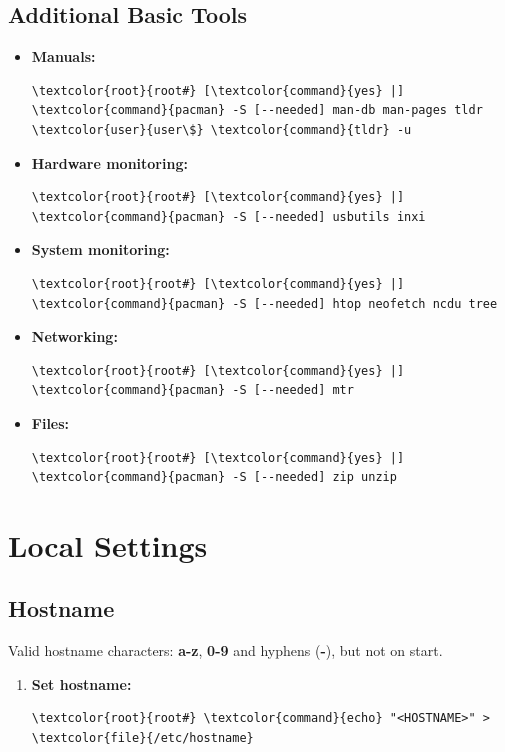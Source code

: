\documentclass[10pt, a4paper, onecolumn, oneside, titlepage, openany]{book}
\begin{document}
\section{Additional Basic Tools}
\begin{itemize}
    \item \textbf{Manuals:}
\begin{Verbatim}[commandchars=\\\{\}]
\textcolor{root}{root#} [\textcolor{command}{yes} |] \textcolor{command}{pacman} -S [--needed] man-db man-pages tldr
\textcolor{user}{user\$} \textcolor{command}{tldr} -u
\end{Verbatim}    
    \item \textbf{Hardware monitoring:}
\begin{Verbatim}[commandchars=\\\{\}]
\textcolor{root}{root#} [\textcolor{command}{yes} |] \textcolor{command}{pacman} -S [--needed] usbutils inxi
\end{Verbatim}
    \item \textbf{System monitoring:}
\begin{Verbatim}[commandchars=\\\{\}]
\textcolor{root}{root#} [\textcolor{command}{yes} |] \textcolor{command}{pacman} -S [--needed] htop neofetch ncdu tree
\end{Verbatim}
    \item \textbf{Networking:}
\begin{Verbatim}[commandchars=\\\{\}]
\textcolor{root}{root#} [\textcolor{command}{yes} |] \textcolor{command}{pacman} -S [--needed] mtr
\end{Verbatim}
    \item \textbf{Files:}
\begin{Verbatim}[commandchars=\\\{\}]
\textcolor{root}{root#} [\textcolor{command}{yes} |] \textcolor{command}{pacman} -S [--needed] zip unzip
\end{Verbatim}
\end{itemize}


\chapter{Local Settings}
\section{Hostname}
Valid hostname characters: \textbf{a-z}, \textbf{0-9} and hyphens (\textbf{-}), but not on start.
\begin{enumerate}
    \item \textbf{Set hostname:}
\begin{Verbatim}[commandchars=\\\{\}]
\textcolor{root}{root#} \textcolor{command}{echo} "<HOSTNAME>" > \textcolor{file}{/etc/hostname}
\end{Verbatim}    
\end{enumerate}
\end{document}
